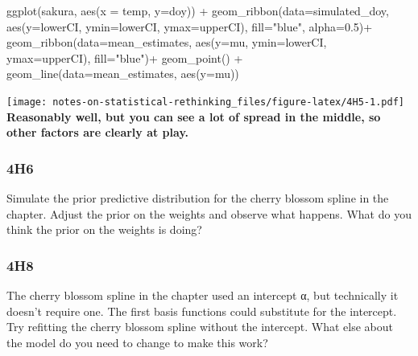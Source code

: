 \documentclass[
]{book}
\newenvironment{Shaded}{\begin{snugshade}}{\end{snugshade}}
\newcommand{\AttributeTok}[1]{\textcolor[rgb]{0.77,0.63,0.00}{#1}}
\newcommand{\FloatTok}[1]{\textcolor[rgb]{0.00,0.00,0.81}{#1}}
\newcommand{\FunctionTok}[1]{\textcolor[rgb]{0.00,0.00,0.00}{#1}}
\newcommand{\NormalTok}[1]{#1}
\newcommand{\SpecialCharTok}[1]{\textcolor[rgb]{0.00,0.00,0.00}{#1}}
\newcommand{\StringTok}[1]{\textcolor[rgb]{0.31,0.60,0.02}{#1}}
\begin{document}
\begin{Shaded}
\begin{Highlighting}[]
\FunctionTok{ggplot}\NormalTok{(sakura, }\FunctionTok{aes}\NormalTok{(}\AttributeTok{x =}\NormalTok{ temp, }\AttributeTok{y=}\NormalTok{doy)) }\SpecialCharTok{+} 
  \FunctionTok{geom\_ribbon}\NormalTok{(}\AttributeTok{data=}\NormalTok{simulated\_doy, }\FunctionTok{aes}\NormalTok{(}\AttributeTok{y=}\NormalTok{lowerCI, }\AttributeTok{ymin=}\NormalTok{lowerCI, }\AttributeTok{ymax=}\NormalTok{upperCI), }\AttributeTok{fill=}\StringTok{"blue"}\NormalTok{, }\AttributeTok{alpha=}\FloatTok{0.5}\NormalTok{)}\SpecialCharTok{+}
  \FunctionTok{geom\_ribbon}\NormalTok{(}\AttributeTok{data=}\NormalTok{mean\_estimates, }\FunctionTok{aes}\NormalTok{(}\AttributeTok{y=}\NormalTok{mu, }\AttributeTok{ymin=}\NormalTok{lowerCI, }\AttributeTok{ymax=}\NormalTok{upperCI), }\AttributeTok{fill=}\StringTok{"blue"}\NormalTok{)}\SpecialCharTok{+}
  \FunctionTok{geom\_point}\NormalTok{() }\SpecialCharTok{+} 
  \FunctionTok{geom\_line}\NormalTok{(}\AttributeTok{data=}\NormalTok{mean\_estimates, }\FunctionTok{aes}\NormalTok{(}\AttributeTok{y=}\NormalTok{mu))}
\end{Highlighting}
\end{Shaded}

\texttt{[image: notes-on-statistical-rethinking\_files/figure-latex/4H5-1.pdf]}
\textbf{Reasonably well, but you can see a lot of spread in the middle, so other factors are clearly at play.}

\hypertarget{h6}{%
\subsubsection*{4H6}\label{h6}}

Simulate the prior predictive distribution for the cherry blossom spline in the chapter. Adjust the prior on the weights and observe what happens. What do you think the prior on the weights is doing?

\hypertarget{h8}{%
\subsubsection*{4H8}\label{h8}}

The cherry blossom spline in the chapter used an intercept α, but technically it doesn't require one. The first basis functions could substitute for the intercept. Try refitting the cherry blossom spline without the intercept. What else about the model do you need to change to make this work?

  
\end{document}
